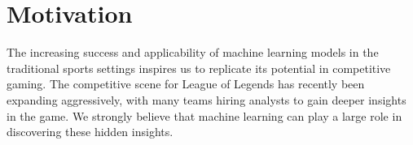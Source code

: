 \section{Motivation}

The increasing success and applicability of machine learning models in the traditional 
sports settings inspires us to replicate its potential in competitive gaming.  
The competitive scene for League of Legends has recently been expanding aggressively, 
with many teams hiring analysts to gain deeper insights in the game.  We strongly 
believe that machine learning can play a large role in discovering these hidden insights.  